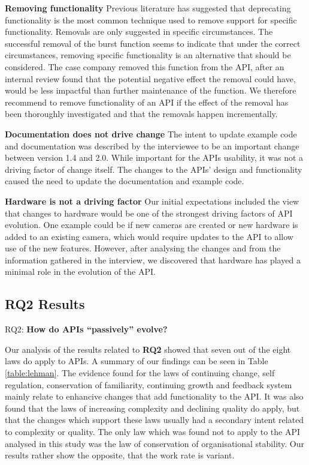 \documentclass{sig-alternate}
\begin{document}
\smallskip \noindent
\textbf{Removing functionality  } 
Previous literature has suggested that deprecating functionality is the most common technique used to remove support for specific functionality. Removals are only suggested in specific circumstances. The successful removal of the burst function seems to indicate that under the correct circumstances, removing specific functionality is an alternative that should be considered. The case company removed this function from the API, after an internal review found that the potential negative effect the removal could have, would be less impactful than further maintenance of the function. We therefore recommend to remove functionality of an API if the effect of the removal has been thoroughly investigated and that the removals happen incrementally.

\smallskip \noindent
\textbf{Documentation does not drive change  } 
The intent to update example code and documentation was described by the interviewee to be an important change between version 1.4 and 2.0. While important for the APIs usability, it was not a driving factor of change itself. The changes to the APIs' design and functionality caused the need to update the documentation and example code.

\smallskip \noindent
\textbf{Hardware is not a driving factor  } 
Our initial expectations included the view that changes to hardware would be one of the strongest driving factors of API evolution. One example could be if new cameras are created or new hardware is added to an existing camera, which would require updates to the API to allow use of the new features. However, after analysing the changes and from the information gathered in the interview, we discovered that hardware has played a minimal role in the evolution of the API. 



\subsection{RQ2 Results} \label{results_RQ2} 
\noindent
RQ2: \textbf{How do APIs ``passively'' evolve?}
\smallskip


Our analysis of the results related to \textbf{RQ2} showed that seven out of the eight laws \cite{lehman90sview} do apply to APIs. A summary of our findings can be seen in Table \ref{table:lehman}. The evidence found for the laws of continuing change, self regulation, conservation of familiarity, continuing growth and feedback system mainly relate to enhancive changes that add functionality to the API. It was also found that the laws of increasing complexity and declining quality do apply, but that the changes which support these laws usually had a secondary intent related to complexity or quality. The only law which was found not to apply to the API analysed in this study was the law of conservation of organisational stability. Our results rather show the opposite, that the work rate is variant. 
\end{document}
